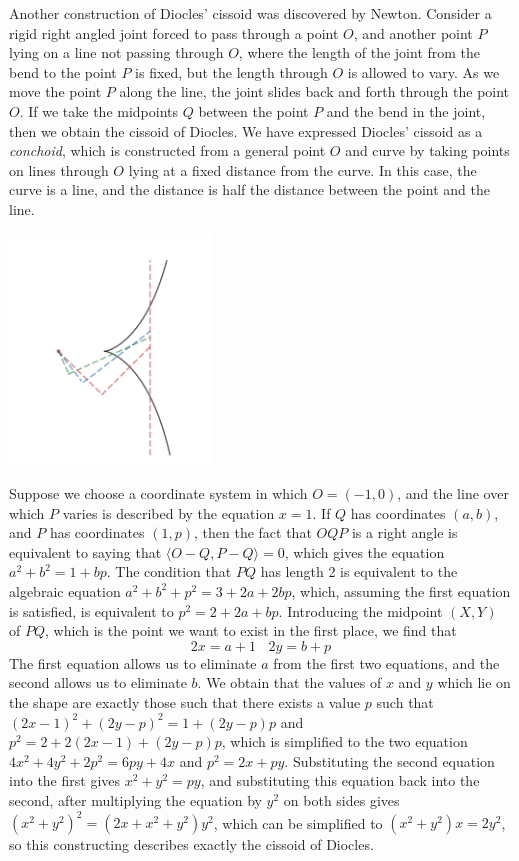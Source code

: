 \begin{example}
    Another construction of Diocles' cissoid was discovered by Newton. Consider a rigid right angled joint forced to pass through a point $O$, and another point $P$ lying on a line not passing through $O$, where the length of the joint from the bend to the point $P$ is fixed, but the length through $O$ is allowed to vary. As we move the point $P$ along the line, the joint slides back and forth through the point $O$. If we take the midpoints $Q$ between the point $P$ and the bend in the joint, then we obtain the cissoid of Diocles. We have expressed Diocles' cissoid as a \emph{conchoid}, which is constructed from a general point $O$ and curve by taking points on lines through $O$ lying at a fixed distance from the curve. In this case, the curve is a line, and the distance is half the distance between the point and the line.
%
    \begin{center}
        \includegraphics[width=0.4\textwidth]{ConchoidDiocles}
    \end{center}
%
    Suppose we choose a coordinate system in which $O = (-1,0)$, and the line over which $P$ varies is described by the equation $x = 1$. If $Q$ has coordinates $(a,b)$, and $P$ has coordinates $(1,p)$, then the fact that $OQP$ is a right angle is equivalent to saying that $\langle O - Q, P - Q \rangle = 0$, which gives the equation $a^2 + b^2 = 1 + bp$. The condition that $PQ$ has length 2 is equivalent to the algebraic equation $a^2 + b^2 + p^2 = 3 + 2a + 2bp$, which, assuming the first equation is satisfied, is equivalent to $p^2 = 2 + 2a + bp$. Introducing the midpoint $(X,Y)$ of $PQ$, which is the point we want to exist in the first place, we find that
    \[ 2x = a + 1\ \ \ \ 2y = b + p \]
    The first equation allows us to eliminate $a$ from the first two equations, and the second allows us to eliminate $b$. We obtain that the values of $x$ and $y$ which lie on the shape are exactly those such that there exists a value $p$ such that $(2x - 1)^2 + (2y - p)^2 = 1 + (2y - p)p$ and $p^2 = 2 + 2(2x - 1) + (2y - p)p$, which is simplified to the two equation $4x^2 + 4y^2 + 2p^2 = 6py + 4x$ and $p^2 = 2x + py$. Substituting the second equation into the first gives $x^2 + y^2 = py$, and substituting this equation back into the second, after multiplying the equation by $y^2$ on both sides gives $(x^2 + y^2)^2 = (2x + x^2 + y^2)y^2$, which can be simplified to $(x^2 + y^2)x = 2y^2$, so this constructing describes exactly the cissoid of Diocles.

\end{example}
